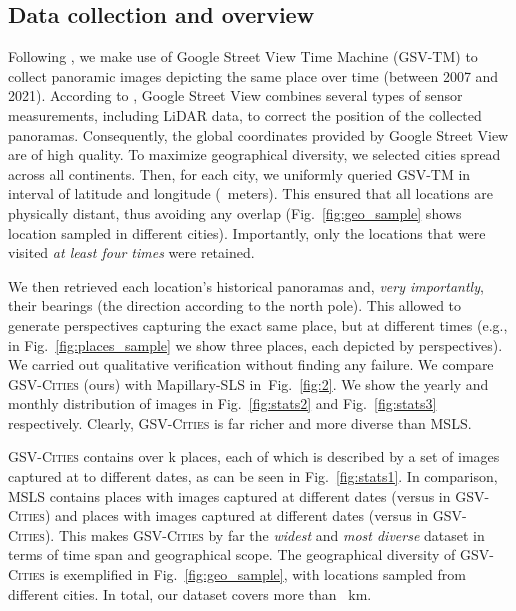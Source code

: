 \documentclass{article}
\begin{document}
\subsection{Data collection and overview}\label{sec:dataset}
Following \cite{arandjelovic2016netvlad, torii201524}, we make use of Google Street View Time Machine (GSV-TM) to collect panoramic images depicting the same place over time (between 2007 and 2021). According to \cite{5481932, klingner2013street}, Google Street View combines several types of sensor measurements, including LiDAR data, to correct the position of the collected panoramas. Consequently, the global coordinates provided by Google Street View are of high quality. To maximize geographical diversity, we selected  cities spread across all continents. Then, for each city, we uniformly queried GSV-TM in interval of  latitude and longitude (~meters). This ensured that all locations are physically distant, thus avoiding any overlap (Fig.~\ref{fig:geo_sample} shows location sampled in  different cities). Importantly, only the locations that were visited \emph{at least four times} were retained. 

We then retrieved each location's historical panoramas and, \emph{very importantly}, their bearings (the direction according to the north pole). This allowed to generate perspectives capturing the exact same place, but at different times (e.g., in Fig.~\ref{fig:places_sample} we show three places, each depicted by  perspectives). We carried out qualitative verification without finding any failure. We compare \textsc{GSV-Cities} (ours) with Mapillary-SLS in~Fig.~\ref{fig:2}.
We show the yearly and monthly distribution of images in Fig.~\ref{fig:stats2} and  Fig.~\ref{fig:stats3} respectively. Clearly, \textsc{GSV-Cities} is far richer and more diverse than MSLS.

\textsc{GSV-Cities} contains over k places, each of which is described by a set of images captured at  to  different dates, as can be seen in Fig.~\ref{fig:stats1}. In comparison, MSLS contains  places with images captured at  different dates (versus  in \textsc{GSV-Cities}) and  places with images captured at  different dates (versus  in \mbox{\textsc{GSV-Cities}}). This makes \textsc{GSV-Cities} by far the \emph{widest} and \emph{most diverse} dataset in terms of time span and geographical scope. The geographical diversity of \textsc{GSV-Cities} is exemplified in Fig.~\ref{fig:geo_sample}, with locations sampled from  different cities. In total, our dataset covers more than ~km.
\end{document}

